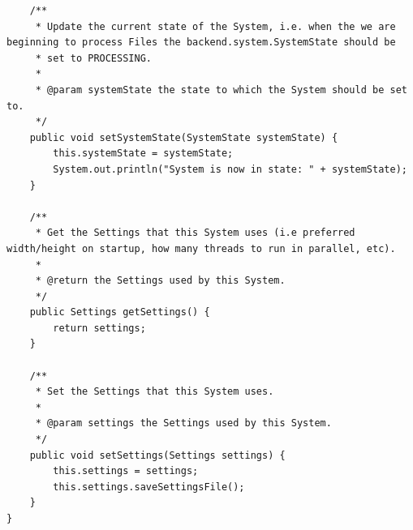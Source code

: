 \begin{lstlisting}
    /**
     * Update the current state of the System, i.e. when the we are beginning to process Files the backend.system.SystemState should be
     * set to PROCESSING.
     *
     * @param systemState the state to which the System should be set to.
     */
    public void setSystemState(SystemState systemState) {
        this.systemState = systemState;
        System.out.println("System is now in state: " + systemState);
    }

    /**
     * Get the Settings that this System uses (i.e preferred width/height on startup, how many threads to run in parallel, etc).
     *
     * @return the Settings used by this System.
     */
    public Settings getSettings() {
        return settings;
    }

    /**
     * Set the Settings that this System uses.
     *
     * @param settings the Settings used by this System.
     */
    public void setSettings(Settings settings) {
        this.settings = settings;
        this.settings.saveSettingsFile();
    }
}
\end{lstlisting}
